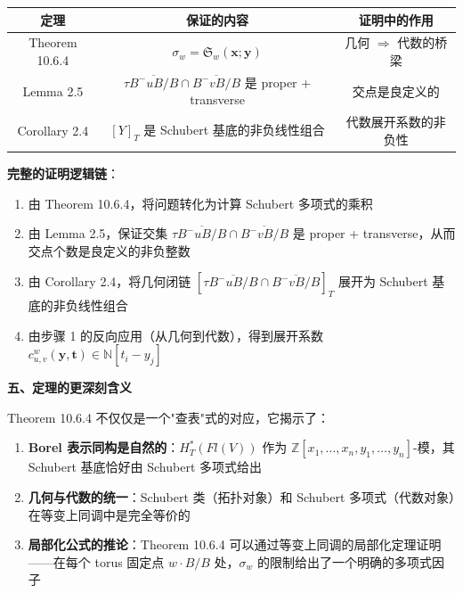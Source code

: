 \begin{center}
\begin{tabular}{c|c|c}
\hline
\textbf{定理} & \textbf{保证的内容} & \textbf{证明中的作用} \\ \hline
Theorem 10.6.4 & $\sigma_w = \mathfrak{S}_w(\mathbf{x}; \mathbf{y})$ & 几何 $\Rightarrow$ 代数的桥梁 \\ \hline
Lemma 2.5 & $\tau\overline{B^-uB/B} \cap \overline{B^-vB/B}$ 是 proper + transverse & 交点是良定义的 \\ \hline
Corollary 2.4 & $[Y]_T$ 是 Schubert 基底的非负线性组合 & 代数展开系数的非负性 \\ \hline
\end{tabular}
\end{center}

\textbf{完整的证明逻辑链}：

\begin{enumerate}
\item 由 Theorem 10.6.4，将问题转化为计算 Schubert 多项式的乘积

\item 由 Lemma 2.5，保证交集 $\tau\overline{B^-uB/B} \cap \overline{B^-vB/B}$ 是 proper + transverse，从而交点个数是良定义的非负整数

\item 由 Corollary 2.4，将几何闭链 $[\tau\overline{B^-uB/B} \cap \overline{B^-vB/B}]_T$ 展开为 Schubert 基底的非负线性组合

\item 由步骤 1 的反向应用（从几何到代数），得到展开系数 $c_{u,v}^w(\mathbf{y}, \mathbf{t}) \in \mathbb{N}[t_i - y_j]$
\end{enumerate}

\textbf{五、定理的更深刻含义}

Theorem 10.6.4 不仅仅是一个"查表"式的对应，它揭示了：

\begin{enumerate}
\item \textbf{Borel 表示同构是自然的}：$H_T^*(Fl(V))$ 作为 $\mathbb{Z}[x_1,\ldots,x_n,y_1,\ldots,y_n]$-模，其 Schubert 基底恰好由 Schubert 多项式给出

\item \textbf{几何与代数的统一}：Schubert 类（拓扑对象）和 Schubert 多项式（代数对象）在等变上同调中是完全等价的

\item \textbf{局部化公式的推论}：Theorem 10.6.4 可以通过等变上同调的局部化定理证明——在每个 torus 固定点 $w \cdot B/B$ 处，$\sigma_w$ 的限制给出了一个明确的多项式因子
\end{enumerate}

